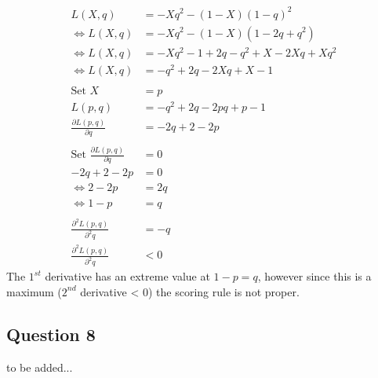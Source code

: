 \documentclass[../main/Notes.tex]{subfiles}
\begin{document}
\begin{align*}
                L(X,q) &= -Xq^2-(1-X)(1-q)^2 \\
\Leftrightarrow L(X,q) &= -Xq^2-(1-X)(1-2q+q^2) \\
\Leftrightarrow L(X,q) &= -Xq^2-1+2q-q^2+X-2Xq+Xq^2 \\
\Leftrightarrow L(X,q) &= -q^2+2q-2Xq+X-1 \\
\\
\text{Set }X&=p \\
L(p,q) &= -q^2+2q-2pq+p-1 \\
\frac{\partial L(p,q)}{\partial q} &= -2q+2-2p \\
\\
\text{Set }\frac{\partial L(p,q)}{\partial q}&=0 \\
-2q+2-2p &= 0\\
\Leftrightarrow 2-2p&=2q \\
\Leftrightarrow 1-p&=q \\
\\
\frac{\partial^2 L(p,q)}{\partial^2 q} &= -q \\
\frac{\partial^2 L(p,q)}{\partial^2 q} &< 0
\end{align*}
The $1^{st}$ derivative has an extreme value at $1-p=q$, however since this is a maximum ($2^{nd}$ derivative < 0) the scoring rule is not proper.



\subsection*{Question 8}
to be added...
\end{document}

